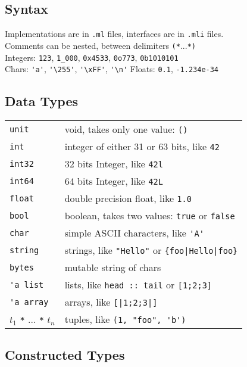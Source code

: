\documentclass[10pt,landscape]{article}
\begin{document}
\setlength{\premulticols}{1pt}
\setlength{\postmulticols}{1pt}
\setlength{\multicolsep}{1pt}
\setlength{\columnsep}{2em}


\begin{multicols}{3}

\subsection{Syntax}

Implementations are in \Verb!.ml! files, interfaces are in \Verb!.mli!
files.\\
 Comments can be nested, between delimiters \Verb!(*!...\Verb!*)!\\
Integers: \Verb!123!, \Verb!1_000!, \Verb!0x4533!, \Verb!0o773!, \Verb!0b1010101!\\
Chars: \Verb!'a'!, \Verb!'\255'!, \Verb!'\xFF'!, \Verb!'\n'!
\hfill
Floats: \Verb!0.1!, \Verb!-1.234e-34!\\
\subsection{Data Types}

\begin{tabular}{ll}
\Verb!unit! & void, takes only one value: \Verb!()!\\
\Verb!int! & integer of either 31 or 63 bits, like \Verb!42! \\
\Verb!int32! & 32 bits Integer, like \Verb!42l! \\
\Verb!int64! & 64 bits Integer, like \Verb!42L! \\
\Verb!float! & double precision float, like \Verb!1.0! \\
\Verb!bool! & boolean, takes two values: \Verb!true! or \Verb!false!\\
\Verb!char! & simple ASCII characters, like \Verb!'A'!\\
\Verb!string! & strings, like \Verb!"Hello"! or \Verb!{foo|Hello|foo}!\\
\Verb!bytes! & mutable string of chars \\
\Verb!'a list! & lists, like \Verb!head :: tail! or \Verb![1;2;3]!   \\
\Verb!'a array! & arrays, like \Verb![|1;2;3|]! \\
$t_1$ \Verb!*! ... \Verb!*! $t_n$& tuples, like \Verb!(1, "foo", 'b')!
\end{tabular}

\subsection{Constructed Types}


\end{multicols}
\end{document}

